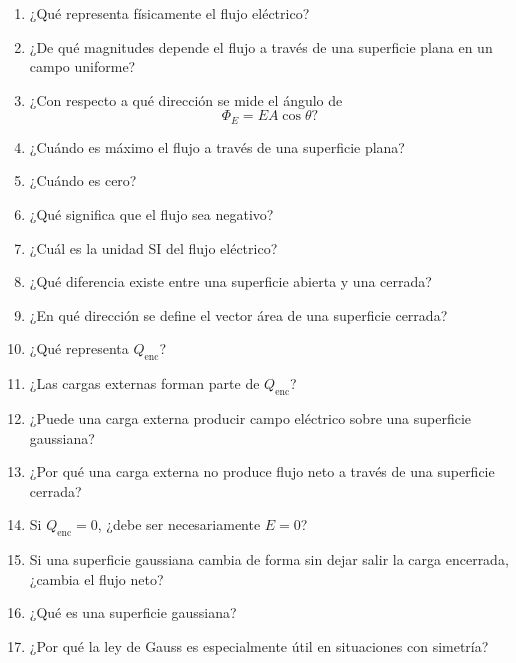 \begin{enumerate}
    \item ¿Qué representa físicamente el flujo eléctrico?

    \item ¿De qué magnitudes depende el flujo a través de una superficie plana en un
    campo uniforme?

    \item ¿Con respecto a qué dirección se mide el ángulo de
    \[
    \Phi_E=EA\cos\theta?
    \]

    \item ¿Cuándo es máximo el flujo a través de una superficie plana?

    \item ¿Cuándo es cero?

    \item ¿Qué significa que el flujo sea negativo?

    \item ¿Cuál es la unidad SI del flujo eléctrico?

    \item ¿Qué diferencia existe entre una superficie abierta y una cerrada?

    \item ¿En qué dirección se define el vector área de una superficie cerrada?

    \item ¿Qué representa \(Q_{\text{enc}}\)?

    \item ¿Las cargas externas forman parte de \(Q_{\text{enc}}\)?

    \item ¿Puede una carga externa producir campo eléctrico sobre una superficie
    gaussiana?

    \item ¿Por qué una carga externa no produce flujo neto a través de una superficie
    cerrada?

    \item Si \(Q_{\text{enc}}=0\), ¿debe ser necesariamente \(E=0\)?

    \item Si una superficie gaussiana cambia de forma sin dejar salir la carga encerrada,
    ¿cambia el flujo neto?

    \item ¿Qué es una superficie gaussiana?

    \item ¿Por qué la ley de Gauss es especialmente útil en situaciones con simetría?


\end{enumerate}
